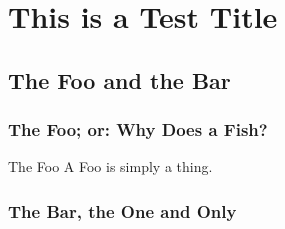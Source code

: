 \documentclass[a4paper]{book}
\begin{document}
\setcounter{chapter}{2}
\chapter{This is a Test Title}
\section{The Foo and the Bar}
\subsection{The Foo; or: Why Does a Fish?}
\Blindtext
\begin{definition}{The Foo}{}
	A Foo is simply a thing.
\end{definition}
\subsection{The Bar, the One and Only}
\blindtext[6]
\end{document}
